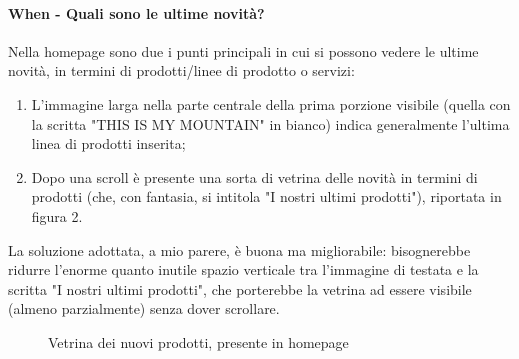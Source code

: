 \paragraph{When - Quali sono le ultime novità?}
Nella homepage sono due i punti principali in cui si possono vedere le ultime novità, in termini di prodotti/linee di prodotto o servizi:
\begin{enumerate}
	\item L'immagine larga nella parte centrale della prima porzione visibile (quella con la scritta "THIS IS MY MOUNTAIN" in bianco) indica generalmente l'ultima linea di prodotti inserita;
	\item Dopo una scroll è presente una sorta di vetrina delle novità in termini di prodotti (che, con fantasia, si intitola "I nostri ultimi prodotti"), riportata in figura 2.
\end{enumerate}
La soluzione adottata, a mio parere, è buona ma migliorabile: bisognerebbe ridurre l'enorme quanto inutile spazio verticale tra l'immagine di testata e la scritta "I nostri ultimi prodotti", che porterebbe la vetrina ad essere visibile (almeno parzialmente) senza dover scrollare.

\begin{figure}[!htb]
	\caption{\label{fig:figura3} Vetrina dei nuovi prodotti, presente in homepage}
\end{figure}

